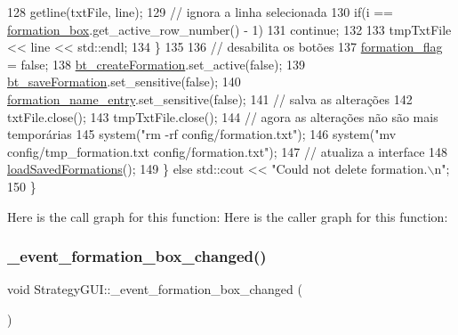 \begin{DoxyCode}
128             getline(txtFile, line);
129             \textcolor{comment}{// ignora a linha selecionada}
130             \textcolor{keywordflow}{if}(i == \hyperlink{class_strategy_g_u_i_a0f2ab3a2cdca1663def9c4ec1e366a5d}{formation\_box}.get\_active\_row\_number() - 1)
131                 \textcolor{keywordflow}{continue};
132 
133             tmpTxtFile << line << std::endl;
134         \}
135 
136         \textcolor{comment}{// desabilita os botões}
137         \hyperlink{class_strategy_g_u_i_aaac145125516fb8b7fe7137db18cdb58}{formation\_flag} = \textcolor{keyword}{false};
138         \hyperlink{class_strategy_g_u_i_ab6edc11fb98709c98ad1815998aa937a}{bt\_createFormation}.set\_active(\textcolor{keyword}{false});
139         \hyperlink{class_strategy_g_u_i_ae68d7475f55a82e46d74eb8b3cd53b9e}{bt\_saveFormation}.set\_sensitive(\textcolor{keyword}{false});
140         \hyperlink{class_strategy_g_u_i_a19406b76eaf73c06545aa1c67c0636ce}{formation\_name\_entry}.set\_sensitive(\textcolor{keyword}{false});
141         \textcolor{comment}{// salva as alterações}
142         txtFile.close();
143         tmpTxtFile.close();
144         \textcolor{comment}{// agora as alterações não são mais temporárias}
145         system(\textcolor{stringliteral}{"rm -rf config/formation.txt"});
146         system(\textcolor{stringliteral}{"mv config/tmp\_formation.txt config/formation.txt"});
147         \textcolor{comment}{// atualiza a interface}
148         \hyperlink{class_strategy_g_u_i_a616a0f321878532cf85cfd02564758b5}{loadSavedFormations}();
149     \} \textcolor{keywordflow}{else} std::cout << \textcolor{stringliteral}{"Could not delete formation.\(\backslash\)n"};
150 \}
\end{DoxyCode}
Here is the call graph for this function\+:
Here is the caller graph for this function\+:
\mbox{\label{class_strategy_g_u_i_a3b4da86e02b0e51013801fed1ab9807f}} 
\subsubsection{\texorpdfstring{\+\_\+event\+\_\+formation\+\_\+box\+\_\+changed()}{\_event\_formation\_box\_changed()}}
{\footnotesize\ttfamily void Strategy\+G\+U\+I\+::\+\_\+event\+\_\+formation\+\_\+box\+\_\+changed (\begin{DoxyParamCaption}{ }\end{DoxyParamCaption})\hspace{0.3cm}{\ttfamily [private]}}



